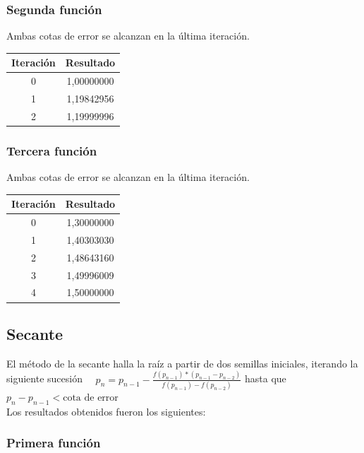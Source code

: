 \documentclass[titlepage,a4paper]{article}
\begin{document}
\subsubsection{Segunda función}\label{sec:NRM2}
Ambas cotas de error se alcanzan en la última iteración.
\begin{center}
    \begin{tabular}{| c | c |}
    \hline
     Iteración & Resultado \\ \hline
    0     & 1,00000000 \\
        1     & 1,19842956 \\
        2     & 1,19999996 \\
    \hline
    \end{tabular}
\end{center}
\subsubsection{Tercera función}\label{sec:NRM3}
Ambas cotas de error se alcanzan en la última iteración.
\begin{center}
    \begin{tabular}{| c | c |}
    \hline
     Iteración & Resultado \\ \hline
        0     & 1,30000000 \\
        1     & 1,40303030 \\
        2     & 1,48643160 \\
        3     & 1,49996009 \\
        4     & 1,50000000 \\
    \hline
    \end{tabular}
\end{center}

\subsection{Secante}\label{sec:biseccion}
El método de la secante halla la raíz a partir de dos semillas iniciales, iterando la siguiente sucesión
$\quad p_{n} =p_{n-1}-\frac{f (p_{n-1})*(p_{n-1}-p_{n-2})}{f(p_{n-1})-f(p_{n-2})}$ hasta que $p_{n}-p_{n-1} < \mbox{cota de error}$
\\

Los resultados obtenidos fueron los siguientes:

\subsubsection{Primera función}\label{sec:sec1}
\end{document}
